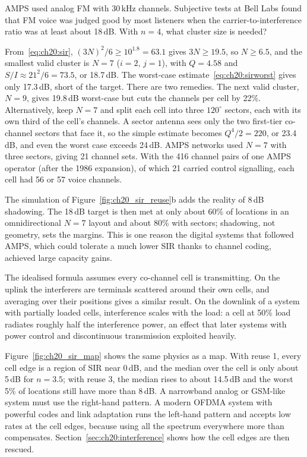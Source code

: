 \begin{worked}
AMPS used analog FM with 30\,kHz channels. Subjective tests at Bell Labs found that FM voice was judged
good by most listeners when the carrier-to-interference ratio was at least about 18\,dB. With $n=4$, what
cluster size is needed?

From~\eqref{eq:ch20:sir}, $(3N)^2/6\ge10^{1.8}=63.1$ gives $3N\ge19.5$, so $N\ge6.5$, and the smallest
valid cluster is $N=7$ ($i=2$, $j=1$), with $Q=4.58$ and $S/I\approx21^2/6=73.5$, or 18.7\,dB. The
worst-case estimate~\eqref{eq:ch20:sirworst} gives only 17.3\,dB, short of the target. There are two
remedies. The next valid cluster, $N=9$, gives 19.8\,dB worst-case but cuts the channels per cell by 22\%.
Alternatively, keep $N=7$ and split each cell into three $120^\circ$ sectors, each with its own third of the
cell's channels. A sector antenna sees only the two first-tier co-channel sectors that face it, so the simple
estimate becomes $Q^4/2=220$, or 23.4\,dB, and even the worst case exceeds 24\,dB. AMPS networks used $N=7$
with three sectors, giving 21 channel sets. With the 416 channel pairs of one AMPS operator (after the 1986
expansion), of which 21 carried control signalling, each cell had 56 or 57 voice channels.

The simulation of Figure~\ref{fig:ch20_sir_reuse}b adds the reality of 8\,dB shadowing. The 18\,dB target is
then met at only about 60\% of locations in an omnidirectional $N=7$ layout and about 80\% with sectors;
shadowing, not geometry, sets the margins. This is one reason the digital systems that followed AMPS, which
could tolerate a much lower SIR thanks to channel coding, achieved large capacity gains.
\end{worked}

The idealised formula assumes every co-channel cell is transmitting. On the uplink the interferers are
terminals scattered around their own cells, and averaging over their positions gives a similar result. On the
downlink of a system with partially loaded cells, interference scales with the load: a cell at 50\% load
radiates roughly half the interference power, an effect that later systems with power control and
discontinuous transmission exploited heavily.

Figure~\ref{fig:ch20_sir_map} shows the same physics as a map. With reuse 1, every cell edge is a region of
SIR near 0\,dB, and the median over the cell is only about 5\,dB for $n=3.5$; with reuse 3, the median rises to
about 14.5\,dB and the worst 5\% of locations still have more than 8\,dB. A narrowband analog or GSM-like system
must use the right-hand pattern. A modern OFDMA system with powerful codes and link adaptation runs the
left-hand pattern and accepts low rates at the cell edges, because using all the spectrum everywhere more than
compensates. Section~\ref{sec:ch20:interference} shows how the cell edges are then rescued.


